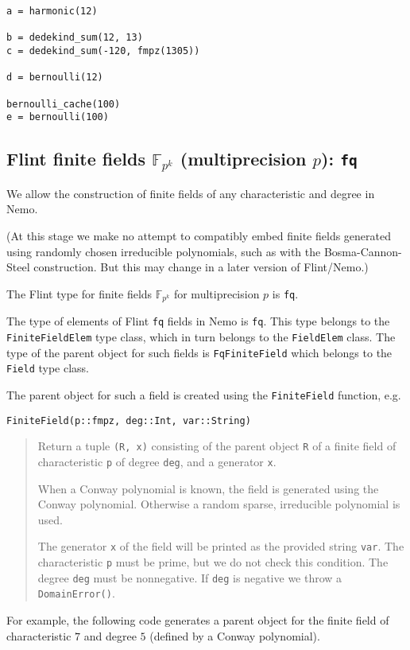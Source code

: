 \documentclass[a4paper,10pt]{article}
\newcommand{\F}{\mathbb{F}}
\newcommand{\code}{\lstinline}
\newcommand{\desc}[1]{\vspace{-3mm}\begin{quote}#1\end{quote}}
\begin{document}
{{\begin{lstlisting}
a = harmonic(12)

b = dedekind_sum(12, 13)
c = dedekind_sum(-120, fmpz(1305))

d = bernoulli(12)

bernoulli_cache(100)
e = bernoulli(100)
\end{lstlisting}

\subsection{Flint finite fields $\F_{p^k}$ (multiprecision $p$): \code|fq|}

We allow the construction of finite fields of any characteristic and degree in
Nemo.

(At this stage we make no attempt to compatibly embed finite fields generated 
using randomly chosen irreducible polynomials, such as with the 
Bosma-Cannon-Steel construction. But this may change in a later version of 
Flint/Nemo.)

The Flint type for finite fields $\F_{p^k}$ for multiprecision $p$ is
\code{fq}.

The type of elements of Flint \code{fq} fields in Nemo is \code{fq}.
This type belongs to the \code{FiniteFieldElem} type class, which in turn belongs
to the \code{FieldElem} class. The type of the parent object for such fields is
\code{FqFiniteField} which belongs to the \code{Field} type class.

The parent object for such a field is created using the \code{FiniteField}
function, e.g.

\begin{lstlisting}
FiniteField(p::fmpz, deg::Int, var::String)
\end{lstlisting}

\desc{Return a tuple \code{(R, x)} consisting of the parent object \code{R} of
a finite field of characteristic \code{p} of degree \code{deg}, and a
generator \code{x}.

When a Conway polynomial is known, the field is generated using the
Conway polynomial. Otherwise a random sparse, irreducible polynomial is used.

The generator \code{x} of the field will be printed as the provided string
\code{var}. The characteristic \code{p} must be prime, but we do not check this
condition. The degree \code{deg} must be nonnegative. If \code{deg} is negative
we throw a \code{DomainError()}.}

For example, the following code generates a parent object for the finite field
of characteristic $7$ and degree $5$ (defined by a Conway polynomial).

}}
\end{document}
